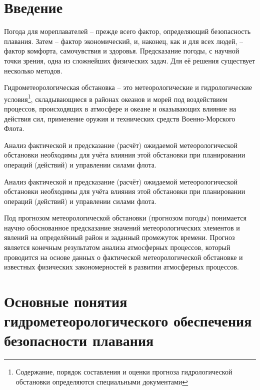 \documentclass[a4paper, 12pt, twoside, final, book, russian, fittopage, cyremdash, openright]{ncc}
\begin{document}


\frontmatter

\openrightorany

{\small \tableofcontents}
{\small \listoffigures}
{\small \listoftables}

\openrightorany

\chapter*{Введение}

Погода для мореплавателей \--- прежде всего фактор, определяющий
безопасность плавания. Затем \--- фактор экономический, и, наконец,
как и для всех людей, \--- фактор комфорта, самочувствия и
здоровья. Предсказание погоды, с научной точки зрения, одна из
сложнейших физических задач. Для её решения существует несколько
методов.

Гидрометеорологическая обстановка \--- это метеорологические и
гидрологические условия\footnote{Содержание, порядок составления и
  оценки прогноза гидрологической обстановки определяются специальными
  документами}, складывающиеся в районах океанов и морей под
воздействием процессов, происходящих в атмосфере и океане и
оказывающих влияние на действия сил, применение оружия и технических
средств Военно-Морского Флота.

Анализ фактической и предсказание (расчёт) ожидаемой метеорологической
обстановки необходимы для учёта влияния этой обстановки при
планировании операций (действий) и управлении силами флота.

Анализ фактической и предсказание (расчёт) ожидаемой метеорологической
обстановки необходимы для учёта влияния этой обстановки при
планировании операций (действий) и управлении силами флота.

Под прогнозом метеорологической обстановки (прогнозом погоды)
понимается научно обоснованное предсказание значений метеорологических
элементов и явлений на определённый район и заданный промежуток
времени. Прогноз является конечным результатом анализа атмосферных
процессов, который проводится на основе данных о фактической
метеорологической обстановке и известных физических закономерностей в
развитии атмосферных процессов.

\mainmatter

\chapter{Основные понятия гидрометеорологического обеспечения безопасности плавания}
\end{document}
